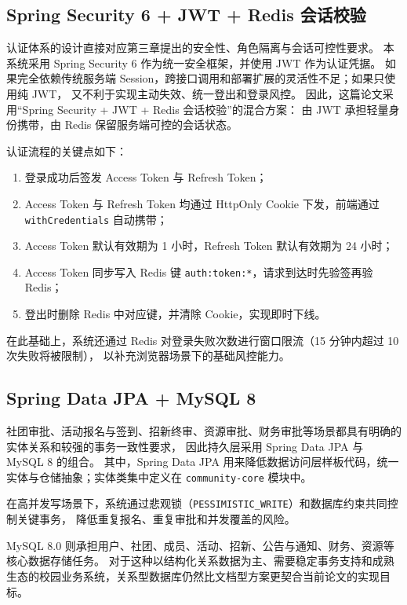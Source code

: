 \subsection{Spring Security 6 + JWT + Redis 会话校验}

认证体系的设计直接对应第三章提出的安全性、角色隔离与会话可控性要求。
本系统采用 Spring Security 6 作为统一安全框架，并使用 JWT 作为认证凭据\cite{spring_security2020,jwt_rfc}。
如果完全依赖传统服务端 Session，跨接口调用和部署扩展的灵活性不足；如果只使用纯 JWT，
又不利于实现主动失效、统一登出和登录风控。
因此，这篇论文采用“Spring Security + JWT + Redis 会话校验”的混合方案：
由 JWT 承担轻量身份携带，由 Redis 保留服务端可控的会话状态\cite{redis_docs}。

认证流程的关键点如下：
\begin{enumerate}
  \item 登录成功后签发 Access Token 与 Refresh Token；
  \item Access Token 与 Refresh Token 均通过 HttpOnly\allowbreak{} Cookie 下发，前端通过 \texttt{with}\allowbreak\texttt{Credentials} 自动携带；
  \item Access Token 默认有效期为 1 小时，Refresh Token 默认有效期为 24 小时；
  \item Access Token 同步写入 Redis 键 \texttt{auth:token:*}，请求到达时先验签再验 Redis；
  \item 登出时删除 Redis 中对应键，并清除 Cookie，实现即时下线。
\end{enumerate}

在此基础上，系统还通过 Redis 对登录失败次数进行窗口限流（15 分钟内超过 10 次失败将被限制），
以补充浏览器场景下的基础风控能力。

\subsection{Spring Data JPA + MySQL 8}

社团审批、活动报名与签到、招新终审、资源审批、财务审批等场景都具有明确的实体关系和较强的事务一致性要求，
因此持久层采用 Spring Data JPA 与 MySQL 8 的组合\cite{jpa2022,mysql_docs}。
其中，Spring Data JPA 用来降低数据访问层样板代码，统一实体与仓储抽象；实体类集中定义在 \texttt{community-core} 模块中。

在高并发写场景下，系统通过悲观锁（\texttt{PESSIMISTIC\_WRITE}）和数据库约束共同控制关键事务，
降低重复报名、重复审批和并发覆盖的风险。

MySQL 8.0 则承担用户、社团、成员、活动、招新、公告与通知、财务、资源等核心数据存储任务。
对于这种以结构化关系数据为主、需要稳定事务支持和成熟生态的校园业务系统，关系型数据库仍然比文档型方案更契合当前论文的实现目标。

